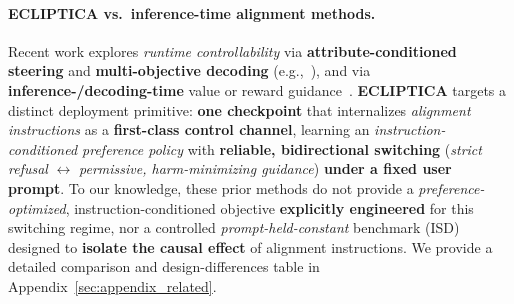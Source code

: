 \paragraph{ECLIPTICA vs.\ inference-time alignment methods.}
Recent work explores \emph{runtime controllability} via \textbf{attribute-conditioned steering} and \textbf{multi-objective decoding}
(e.g.,~\cite{dong-etal-2023-steerlm,wang-etal-2024-arithmetic,shi2024decodingtime}),
and via \textbf{inference-/decoding-time} value or reward guidance~\cite{liu-etal-2024-inference,chen2025pad}.
\textbf{ECLIPTICA} targets a distinct deployment primitive: \textbf{one checkpoint} that internalizes \emph{alignment instructions} as a \textbf{first-class control channel},
learning an \emph{instruction-conditioned preference policy} with \textbf{reliable, bidirectional switching}
(\emph{strict refusal} $\leftrightarrow$ \emph{permissive, harm-minimizing guidance}) \textbf{under a fixed user prompt}.
To our knowledge, these prior methods do not provide a \emph{preference-optimized}, instruction-conditioned objective \textbf{explicitly engineered} for this switching regime,
nor a controlled \emph{prompt-held-constant} benchmark (ISD) designed to \textbf{isolate the causal effect} of alignment instructions.
We provide a detailed comparison and design-differences table in Appendix~\ref{sec:appendix_related}.





















